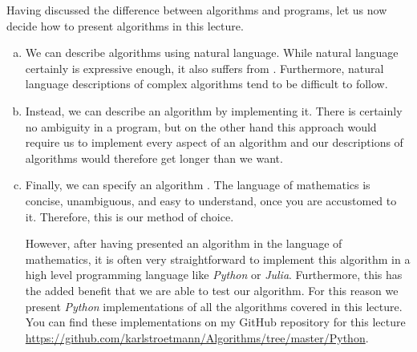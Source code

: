 Having discussed the difference between algorithms and programs, let us now decide how to present
algorithms in this lecture.  
\begin{enumerate}[(a)]
\item We can describe algorithms using natural language.  While natural language certainly is
      expressive enough, it also suffers from .  Furthermore, natural language
      descriptions of complex algorithms tend to be difficult to follow.
\item Instead, we can describe an algorithm by implementing it.  There is certainly no ambiguity
      in a program, but on the other hand this approach would require us to implement every aspect
      of an  algorithm and our descriptions of algorithms would therefore get longer than we want.
\item Finally, we can specify an algorithm .  The language of mathematics is 
      concise, unambiguous, and easy to understand, once you are accustomed to it.  Therefore, this is
      our method of choice.

      However, after having presented an algorithm in the language of mathematics, it is often very
      straightforward to implement this algorithm in a high level programming language like \textsl{Python}
      or \textsl{Julia}.  Furthermore, this has the added benefit that we are able to test our algorithm.  For
      this reason we present \textsl{Python} implementations of all the algorithms covered in this lecture.
      You can find these implementations on my GitHub repository for this lecture
      \\[0.2cm]
      \hspace*{1.3cm}
      \href{https://github.com/karlstroetmann/Algorithms/tree/master/Python}{https://github.com/karlstroetmann/Algorithms/tree/master/Python}.
\end{enumerate}

